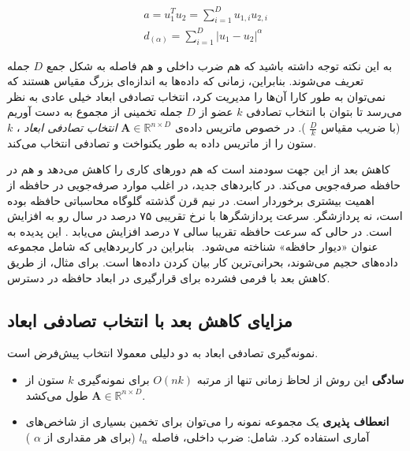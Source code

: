 \begin{align}
a=u_1^T u_2 = \sum_{i=1}^{D} u_{1,i} u_{2,i} \\
d_{(\alpha)} = \sum_{i=1}^{D} \mathopen| u_1 - u_2 \mathclose|^\alpha 
\label{eq:1hP}
\end{align}

به این نکته توجه داشته باشید که هم ضرب داخلی و هم فاصله به شکل جمع
$D$
جمله تعریف می‌شوند. بنابراین، زمانی که داده‌ها به اندازه‌ای بزرگ مقیاس هستند که نمی‌توان به طور کارا آن‌ها را مدیریت کرد، انتخاب تصادفی ابعاد خیلی عادی به نظر می‌رسد تا بتوان با انتخاب تصادفی 
$k$
عضو از 
$D$
جمله تخمینی از مجموع به دست آوریم
(با ضریب مقیاس 
$\frac{D}{k}$
). در خصوص ماتریس داده‌ی 
$\mathbf{A} \in \mathbb{R}^{n \times D}$
\textit{
انتخاب تصادفی ابعاد
}%
، $k$ ستون را از ماتریس داده به طور یکنواخت و تصادفی انتخاب می‌کند.

کاهش بعد از این جهت سودمند است که هم دورهای کاری 
را کاهش ‌می‌دهد و هم در حافظه صرفه‌جویی می‌کند. در کابردهای جدید، در اغلب موارد صرفه‌جویی در حافظه از اهمیت بیشتری برخوردار است. در نیم قرن گذشته گلوگاه‌ محاسباتی حافظه بوده است، نه پردازشگر. سرعت پردازشگرها با نرخ تقریبی ۷۵ درصد در سال رو به افزایش است. در حالی که سرعت حافظه تقریبا سالی ۷ درصد افزایش می‌یابد
\cite{litez139}
. این پدیده به عنوان «دیوار حافظه»%
شناخته می‌شود.
‌\cite{litez139, litez168}
بنابراین در کاربردهایی که شامل مجموعه داده‌های حجیم می‌شوند، بحرانی‌ترین کار بیان کردن داده‌ها است. برای مثال،
از طریق کاهش بعد با فرمی فشرده برای قرارگیری در ابعاد حافظه در دسترس.


\subsection{
مزایای کاهش بعد با انتخاب تصادفی ابعاد
}

نمونه‌گیری تصادفی ابعاد به دو دلیلی معمولا انتخاب پیش‌فرض است.

\begin{itemize}
\item
\textbf{سادگی}
این روش از لحاظ زمانی تنها از مرتبه 
$O(nk)$
برای نمونه‌گیری 
$k$ 
ستون از 
$\mathbf{A} \in \mathbb{R}^{n \times D}$
طول می‌کشد.
\item
\textbf{انعطاف پذیری}
یک مجموعه نمونه را می‌توان برای تخمین بسیاری از شاخص‌های آماری استفاده کرد. شامل: ضرب داخلی، فاصله
$l_\alpha$
(برای هر مقداری از 
$\alpha$
)
\end{itemize}

